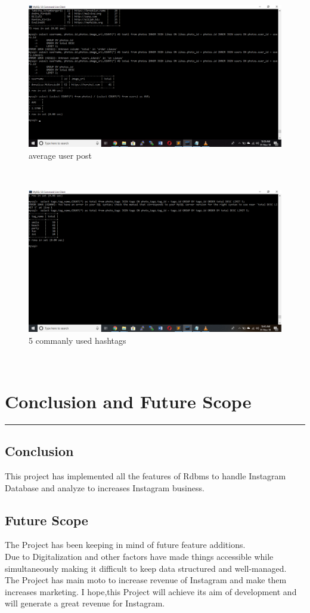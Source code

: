 \begin{figure}[h!]
	\centering
	\includegraphics[width=0.75\linewidth]{sc5.png}
	\caption{average user post}
	
\end{figure}\\
\begin{figure}[h!]
	\centering
	\includegraphics[width=0.75\linewidth]{sc6.png}
	\caption{5 commanly used hashtags}
\end{figure}\\	
\chapter{Conclusion and Future Scope}\hrule
\label{Chapter:5}
\section{Conclusion}
This project has implemented all the features of Rdbms to handle Instagram Database and analyze to increases Instagram business.
\section{Future Scope}
The Project has been keeping in mind of future feature additions.\\
Due to Digitalization and other factors have made things accessible while simultaneously making it difficult to keep data structured and well-managed.\\
The Project has main moto to increase revenue of Instagram and make them increases marketing. I hope,this Project will achieve its aim of development and will generate a great revenue for Instagram.
